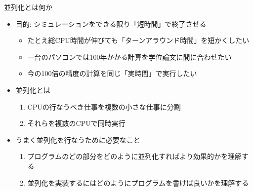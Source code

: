 \begin{frame}[t,fragile]{並列化とは何か}
  \begin{itemize}
    \setlength{\itemsep}{1em}
  \item 目的: シミュレーションをできる限り「短時間」で終了させる
    \begin{itemize}
      \item たとえ総CPU時間が伸びても「ターンアラウンド時間」を短かくしたい
      \item 一台のパソコンでは100年かかる計算を学位論文に間に合わせたい
      \item 今の100倍の精度の計算を同じ「実時間」で実行したい
    \end{itemize}
  \item 並列化とは
    \begin{enumerate}
    \item CPUの行なうべき仕事を複数の小さな仕事に分割
    \item それらを複数のCPUで同時実行
    \end{enumerate}
  \item うまく並列化を行なうために必要なこと
    \begin{enumerate}
    \item プログラムのどの部分をどのように並列化すればより効果的かを理解する
    \item 並列化を実装するにはどのようにプログラムを書けば良いかを理解する
    \end{enumerate}
  \end{itemize}
\end{frame}

